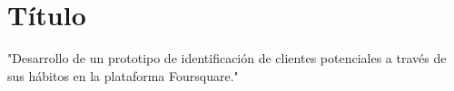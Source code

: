 \chapter{T\'itulo}
\label{sec:titulo}

"Desarrollo de un prototipo de identificaci\'on de clientes potenciales a trav\'es de sus h\'abitos en la plataforma Foursquare."

\pagebreak